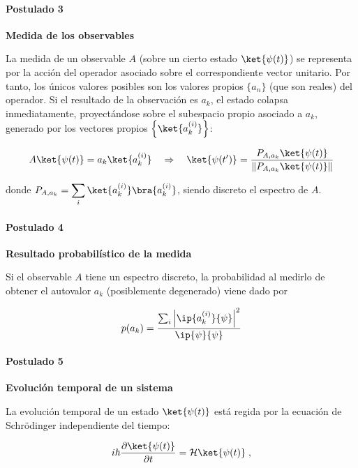 \documentclass[11pt,a4paper,twoside,pdf]{article}
\numberwithin{equation}{section}
\begin{document}
		\paragraph{Postulado 3}\label{Par: Postulado 3} \textbf{Medida de los observables}
			
			La medida de un observable $A$ (sobre un cierto estado $\ket{\psi(t)}$) se representa por la acción del operador asociado sobre el correspondiente vector unitario. Por tanto, los únicos valores posibles son los valores propios $\{a_n\}$ (que son reales) del operador. Si el resultado de la observación es $a_k$, el estado colapsa inmediatamente, proyectándose sobre el subespacio propio asociado a $a_k$, generado por los vectores propios $\left\{\ket{a_k^{(i)}}\right\}$:
			
				\begin{equation}
				  A \ket{\psi(t)} = a_k \ket{a_k^{(i)}}
			    	 	\quad \Rightarrow \quad 
			  		 \ket{\psi(t')} = \frac{P_{A,a_k} \ket{\psi(t)}}{\| P_{A,a_k} \ket{\psi(t)}\|}
				\end{equation}
									
			donde $P_{A,a_k} = \displaystyle\sum_i \ket{a_k^{(i)}} \bra{a_k^{(i)}}$, siendo discreto el espectro de $A$.
			  
		\paragraph{Postulado 4}\label{Par: Postulado 4} \textbf{Resultado probabilístico de la medida}
			
			Si el observable $A$ tiene un espectro discreto, la probabilidad al medirlo de obtener el autovalor $a_k$ (posiblemente degenerado) viene dado por
			
		   		\begin{equation}
		    		p(a_k)=\frac{ \sum_i \left| \ip{a_k^{(i)}}{\psi} \right|^2 }{\ip{\psi}{\psi}}
		   		\end{equation}	
			
		\paragraph{Postulado 5}\label{Par: Postulado 5} \textbf{Evolución temporal de un sistema}			
			
			La evolución temporal de un estado $\ket{\psi(t)}$ está regida por la ecuación de Schrödinger independiente del tiempo:
			  
		   		\begin{equation}
		    		i \hbar \frac{ \partial \ket{\psi(t)} }{ \partial t} = \mathcal{H} \ket{\psi(t)} \; ,
 		   		\end{equation}
			  
\end{document}
